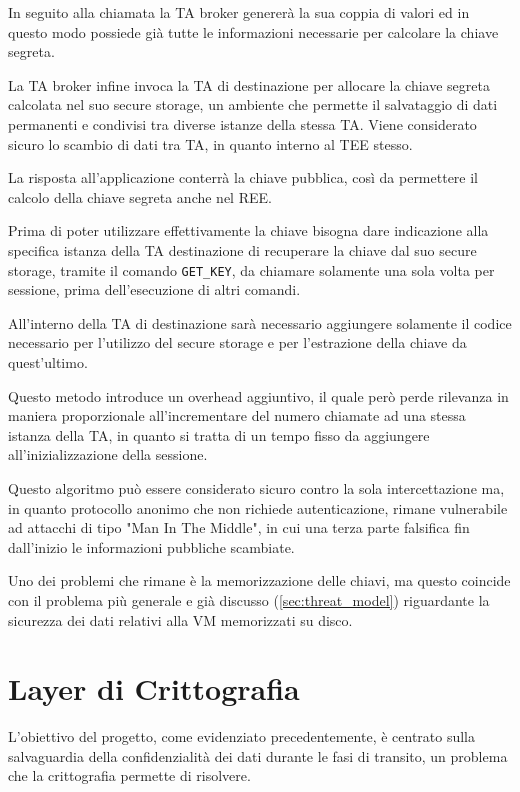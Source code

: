 \documentclass[12pt,italian]{report}
\begin{document}
	In seguito alla chiamata la TA broker genererà la sua coppia di valori ed in questo modo possiede già tutte le informazioni necessarie per calcolare la chiave segreta. 
	
	La TA broker infine invoca la TA di destinazione per allocare la chiave segreta calcolata nel suo secure storage, un ambiente che permette il salvataggio di dati permanenti e condivisi tra diverse istanze della stessa TA. Viene considerato sicuro lo scambio di dati tra TA, in quanto interno al TEE stesso.
	
	La risposta all'applicazione conterrà la chiave pubblica, così da permettere il calcolo della chiave segreta anche nel REE.
	
	Prima di poter utilizzare effettivamente la chiave bisogna dare indicazione alla specifica istanza della TA destinazione di recuperare la chiave dal suo secure storage, tramite il comando \texttt{GET\_KEY}, da chiamare solamente una sola volta per sessione, prima dell'esecuzione di altri comandi.
	
	\bigbreak 
	
	All'interno della TA di destinazione sarà necessario aggiungere solamente il codice necessario per l'utilizzo del secure storage e per l'estrazione della chiave da quest'ultimo.
	
	\bigbreak
	
	Questo metodo introduce un overhead aggiuntivo, il quale però perde rilevanza in maniera proporzionale all'incrementare del numero chiamate ad una stessa istanza della TA, in quanto si tratta di un tempo fisso da aggiungere all'inizializzazione della sessione. 
	
	\bigbreak
	
	Questo algoritmo può essere considerato sicuro contro la sola intercettazione ma, in quanto protocollo anonimo che non richiede autenticazione, rimane vulnerabile ad attacchi di tipo "Man In The Middle", in cui una terza parte falsifica fin dall'inizio le informazioni pubbliche scambiate.
	
	\bigbreak
	
	Uno dei problemi che rimane è la memorizzazione delle chiavi, ma questo coincide con il problema più generale e già discusso (\ref{sec:threat_model}) riguardante la sicurezza dei dati relativi alla VM memorizzati su disco.
	
	\newpage
	
	\section{Layer di Crittografia}
	\label{sec:critt}
	L'obiettivo del progetto, come evidenziato precedentemente, è centrato sulla salvaguardia della confidenzialità dei dati durante le fasi di transito, un problema che la crittografia permette di risolvere. 
	
\end{document}

